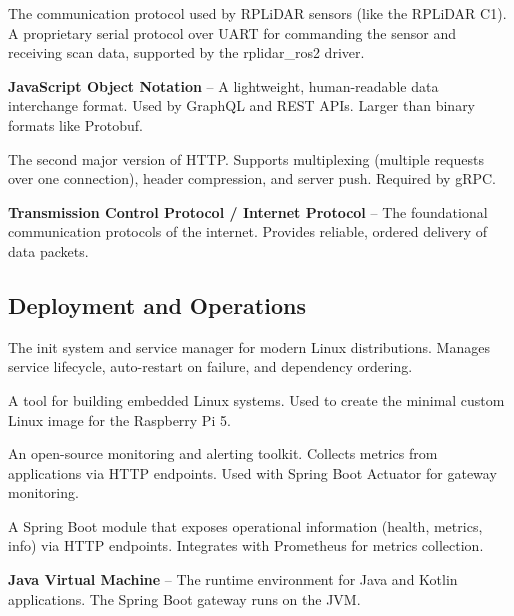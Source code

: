 \documentclass[11pt,letterpaper]{article}
\begin{document}
\begin{description}[style=nextline, leftmargin=2cm]
    \item[SLAMTEC Protocol] The communication protocol used by RPLiDAR sensors (like the RPLiDAR C1). A proprietary serial protocol over UART for commanding the sensor and receiving scan data, supported by the rplidar\_ros2 driver.

    \item[JSON] \textbf{JavaScript Object Notation} -- A lightweight, human-readable data interchange format. Used by GraphQL and REST APIs. Larger than binary formats like Protobuf.

    \item[HTTP/2] The second major version of HTTP. Supports multiplexing (multiple requests over one connection), header compression, and server push. Required by gRPC.

    \item[TCP/IP] \textbf{Transmission Control Protocol / Internet Protocol} -- The foundational communication protocols of the internet. Provides reliable, ordered delivery of data packets.
\end{description}

\subsection{Deployment and Operations}

\begin{description}[style=nextline, leftmargin=2cm]
    \item[systemd] The init system and service manager for modern Linux distributions. Manages service lifecycle, auto-restart on failure, and dependency ordering.

    \item[Buildroot] A tool for building embedded Linux systems. Used to create the minimal custom Linux image for the Raspberry Pi 5.

    \item[Prometheus] An open-source monitoring and alerting toolkit. Collects metrics from applications via HTTP endpoints. Used with Spring Boot Actuator for gateway monitoring.

    \item[Actuator] A Spring Boot module that exposes operational information (health, metrics, info) via HTTP endpoints. Integrates with Prometheus for metrics collection.

    \item[JVM] \textbf{Java Virtual Machine} -- The runtime environment for Java and Kotlin applications. The Spring Boot gateway runs on the JVM.
\end{description}
\end{document}
